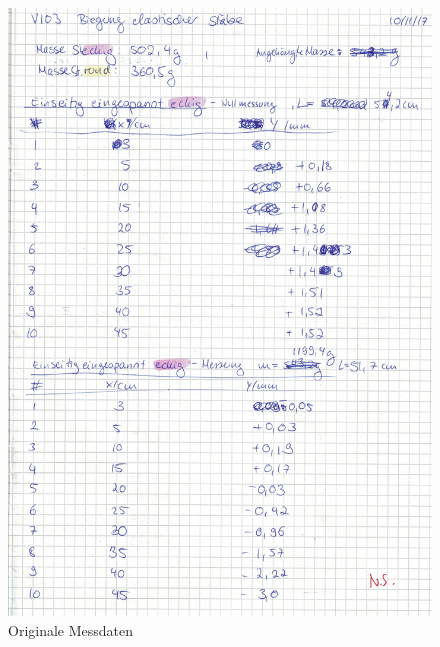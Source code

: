 \begin{figure}
  \centering
  \includegraphics[width=\textwidth]{OMD2.pdf}
  \caption{Originale Messdaten}
  \label{OMD2}
\end{figure}

